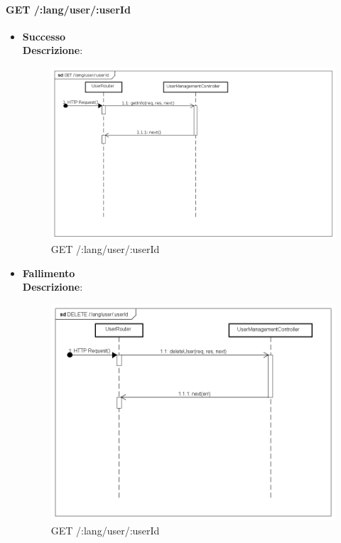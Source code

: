 \paragraph{GET /:lang/user/:userId}
\begin{itemize}
\item \textbf{Successo}
\\
\textbf{Descrizione}:
\label{Procedura di visualizzazione dati utente}
\begin{figure}[ht]
	\centering
	\includegraphics[scale=0.40]{UML/DiagrammiDiSequenza/Back-end/GET_LangUserUserIdSuccess.png}
	\caption{GET /:lang/user/:userId}
\end{figure}

\FloatBarrier

\item \textbf{Fallimento}
\\
\textbf{Descrizione}:
\label{Fallimento della procedura di visualizzazione dati utente}
\begin{figure}[ht]
	\centering
	\includegraphics[scale=0.40]{UML/DiagrammiDiSequenza/Back-end/GET_LangUserUseridFailure.png}
	\caption{GET /:lang/user/:userId}
\end{figure}

\FloatBarrier
\end{itemize}

